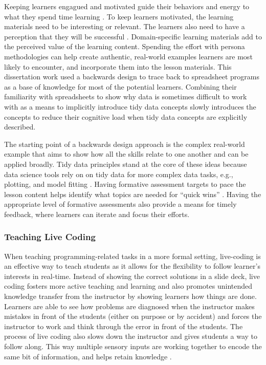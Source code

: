 \documentclass[010-intro.tex]{subfiles}
\begin{document}
        Keeping learners engagued and motivated guide their behaviors and energy to what they spend time learning
        \cite{ambrose2010learning}.
        To keep learners motivated, the learning materials need to be interesting or relevant.
        The learners also need to have a perception that they will be successful
        \cite{ambrose2010learning}.
        Domain-specific learning materials add to the perceived value of the learning content.
        Spending the effort with persona methodologies can help create authentic, real-world examples
        learners are most likely to encounter,
        and incorporate them into the lesson materials.
        This dissertation work used a backwards design to trace back to spreadsheet programs as a base of knowledge
        for most of the potential learners.
        Combining their familiarity with spreadsheets to show why data is sometimes difficult to work with
        as a means to implicitly introduce tidy data concepts slowly introduces the concepts to reduce their
        cognitive load when tidy data concepts are explicitly described.

        The starting point of a backwards design approach is the complex real-world example that
        aims to show how all the skills relate to one another and can be applied broadly.
        Tidy data principles stand at the core of these ideas because data science tools rely on
        on tidy data for more complex data tasks, e.g., plotting, and model fitting
        \cite{wickhamR4ds, wickhamTidyData2014}.
        Having formative assessment targets to pace the lesson content helps identify what topics
        are needed for ``quick wins''
        \cite{Koch2016}.
        Having the appropriate level of formative assessments also provide a means for timely feedback,
        where learners can iterate and focus their efforts.

        \subsubsection{Teaching Live Coding}

        When teaching programming-related tasks in a more formal setting,
        live-coding is an effective way to teach students as it allows for the flexibility to follow learner's interests
        in real-time.
        Instead of showing the correct solutions in a slide deck,
        live coding fosters more active teaching and learning and
        also promotes unintended knowledge transfer from the instructor by showing learners how things are done.
        Learners are able to see how problems are diagnosed when the instructor makes mistakes in front of the students
        (either on purpose or by accident) and forces the instructor to work and think through the error in front of the students.
        The process of live coding also slows down the instructor and gives students a way to follow along.
        This way multiple sensory inputs are working together to encode the same bit of information, and helps retain knowledge
        \cite{wilson2019teaching, hermansProgrammerBrain2021}.
\end{document}
